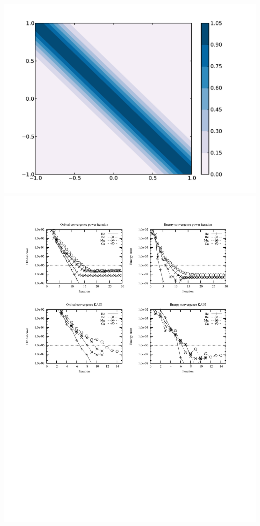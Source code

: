 \documentclass [a4paper, landscape]{report}
\begin{document}
\includegraphics[scale=0.2, clip, viewport = 100 100 370 362]{sparsematrix.pdf}\\
\includegraphics[scale=0.1, clip, viewport = 100 000 370 262]{../accuracy.pdf}
\end{document}

